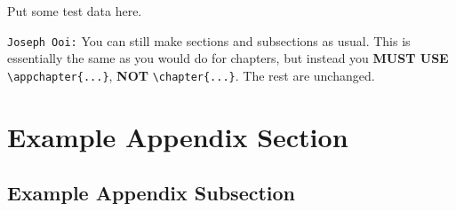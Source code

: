 
Put some test data here. 

\texttt{Joseph Ooi:} You can still make sections and subsections as usual. This is essentially the same as you would do for chapters, but instead you \textbf{MUST USE} \verb|\appchapter{...}|, \textbf{NOT} \verb|\chapter{...}|. The rest are unchanged.

\section{Example Appendix Section}

\subsection{Example Appendix Subsection}